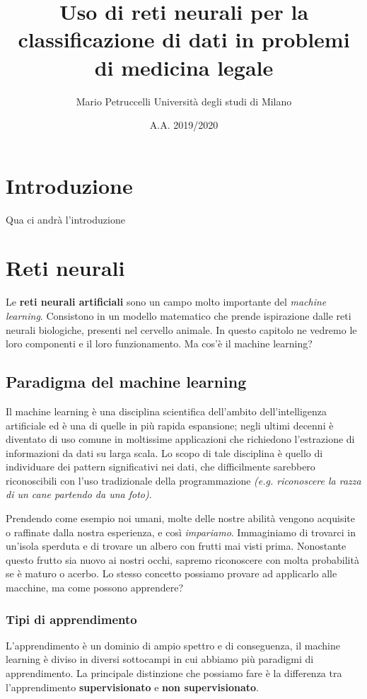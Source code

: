 \documentclass[12pt, twoside, letterpaper]{report}
\title{Uso di reti neurali per la classificazione di dati in problemi di medicina legale}
\author{Mario Petruccelli \cr Università degli studi di Milano}
\date{A.A. 2019/2020}
\begin{document}
	\begin{titlepage}
		
		\newpage
		\tableofcontents
	\end{titlepage}

	\chapter*{Introduzione} 
		Qua ci andrà l'introduzione

		\newpage		
	\chapter{Reti neurali}
		Le \textbf{reti neurali artificiali} sono un campo molto importante del \textit{machine learning}. Consistono in un modello matematico che prende ispirazione dalle reti neurali biologiche, presenti nel cervello animale. In questo capitolo ne vedremo le loro componenti e il loro funzionamento. Ma cos'è il machine learning?

		\section{Paradigma del machine learning}
			Il machine learning è una disciplina scientifica dell'ambito dell'intelligenza artificiale ed è una di quelle in più rapida espansione; negli ultimi decenni è diventato di uso comune in moltissime applicazioni che richiedono l'estrazione di informazioni da dati su larga scala. Lo scopo di tale disciplina è quello di individuare dei pattern significativi nei dati, che difficilmente sarebbero riconoscibili con l'uso tradizionale della programmazione \textit{(e.g. riconoscere la razza di un cane partendo da una foto)}.  
			
			Prendendo come esempio noi umani, molte delle nostre abilità vengono acquisite o raffinate dalla nostra esperienza, e così \textit{impariamo}. Immaginiamo di trovarci in un'isola sperduta e di trovare un albero con frutti mai visti prima. Nonostante questo frutto sia nuovo ai nostri occhi, sapremo riconoscere con molta probabilità se è maturo o acerbo. Lo stesso concetto possiamo provare ad applicarlo alle macchine, ma come possono apprendere? 
			
			\subsection{Tipi di apprendimento} L'apprendimento è un dominio di ampio spettro e di conseguenza, il machine learning è diviso in diversi sottocampi in cui abbiamo più paradigmi di apprendimento. La principale distinzione che possiamo fare è la differenza tra l'apprendimento \textbf{supervisionato} e \textbf{non supervisionato}.
			
\end{document}
